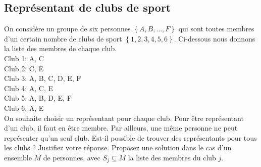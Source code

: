 \subsection{Représentant de clubs de sport}
On considère un groupe de six personnes $\left\lbrace A, B, … , F \right\rbrace$ qui sont toutes membres d'un certain nombre de clubs de sport $\left\lbrace 1, 2, 3, 4, 5, 6 \right\rbrace$. Ci-dessous nous donnons la liste des membres de chaque club. \\
Club 1: A, C \\
Club 2: C, E \\
Club 3: A, B, C, D, E, F \\
Club 4: A, C, E \\
Club 5: A, B, D, E, F \\
Club 6: A, E\\
On souhaite choisir un représentant pour chaque club. Pour être représentant d'un club, il faut en être membre. Par ailleurs, une même personne ne peut représenter qu'un seul club. Est-il possible de trouver des représentants pour tous les clubs ? Justifiez votre réponse. Proposez une solution dans le cas d'un ensemble $M$ de personnes, avec $S_j \subseteq M$ la liste des membres du club $j$. 
